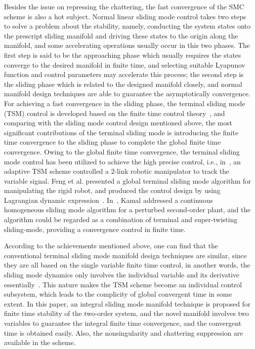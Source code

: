 \documentclass[3p]{elsarticle}
\theoremstyle{plain}
\theoremstyle{remark}
\begin{document}
Besides the issue on repressing the chattering, the fast convergence of the SMC scheme is also a hot subject. Normal linear sliding mode control takes two steps to solve a problem about the stability, namely, conducting the system states onto the prescript sliding manifold and driving these states to the origin along the manifold, and some accelerating operations usually occur in this two phases. The first step is said to be the approaching phase which usually requires the states converge to the desired manifold in finite time, and selecting suitable Lyapunov function and control parameters may accelerate this process; the second step is the sliding phase which is related to the designed manifold closely, and normal manifold design techniques are able to guarantee the asymptotically convergence. For achieving a fast convergence in the sliding phase, the terminal sliding mode (TSM) control is developed based on the finite time control theory~\cite{haimo1986finite,bhat1997finite}, and comparing with the sliding mode control design mentioned above, the most significant contributions of the terminal sliding mode is introducing the finite time convergence to the sliding phase to complete the global finite time convergence. Owing to the global finite time convergence, the terminal sliding mode control has been utilized to achieve the high precise control, i.e., in~\cite{li2015robust}, an adaptive TSM scheme controlled a $2$-link robotic manipulator to track the variable signal. Feng et al. presented a global terminal sliding mode algorithm for manipulating the rigid robot, and produced the control design by using Lagrangian dynamic expression~\cite{feng2002non}. In~\cite{kamal2016continuous}, Kamal addressed a continuous homogeneous sliding mode algorithm for a perturbed second-order plant, and the algorithm could be regarded as a combination of terminal and super-twisting sliding-mode, providing a convergence control in finite time. \par
According to the achievements mentioned above, one can find that the conventional terminal sliding mode manifold design techniques are similar, since they are all based on the single variable finite time control, in another words, the sliding mode dynamics only involves the individual variable and its derivative essentially~\cite{mu2016switching}. This nature makes the TSM scheme become an individual control subsystem, which leads to the complicity of global convergent time in some extent. In this paper, an integral sliding mode manifold technique is proposed for finite time stability of the two-order system, and the novel manifold involves two variables to guarantee the integral finite time convergence, and the convergent time is obtained easily. Also, the nonsingularity and chattering suppression are available in the scheme. \par
\end{document}
